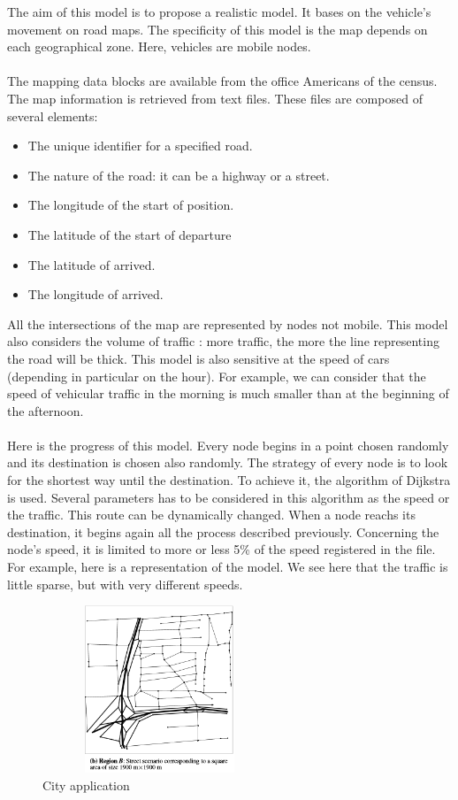 The aim of this model is to propose a realistic model. It bases on the vehicle's movement on road maps. The specificity of this model is the map depends on each geographical zone. Here, vehicles are mobile nodes.\\\\

The mapping data blocks are available from the office Americans of the census. The map information is retrieved from text files. These files are composed of several elements:

\begin{itemize}
\item The unique identifier for a specified road.
\item The nature of the road: it can be a highway or a street.
\item The longitude of the start of position.
\item The latitude of the start of departure
\item The latitude of arrived.
\item The longitude of arrived.
\end{itemize}

All the intersections of the map are represented by nodes not mobile.
This model also considers the volume of traffic : more traffic, the more the line representing the road will be thick.
This model is also sensitive at the speed of cars (depending in particular on the hour). For example, we can consider that the speed of vehicular traffic in the morning is much smaller than at the beginning of the afternoon.\\\\

Here is the progress of this model. Every node begins in a point chosen randomly and its destination is chosen also randomly. The strategy of every node is to look for the shortest way until the destination. To achieve it, the algorithm of Dijkstra is used. Several parameters has to be considered in this algorithm as the speed or the traffic. This route can be dynamically changed. When a node reachs its destination, it begins again all the process described previously. Concerning the node's speed, it is limited to more or less 5\% of the speed registered in the file.\\
For example, here is a representation of the model. We see here that the traffic is little sparse, but with very different speeds.

\begin{figure}[h]
\center
\includegraphics[width=7cm,height=50mm]{../images/city.png}
\caption{City application}
\end{figure}

